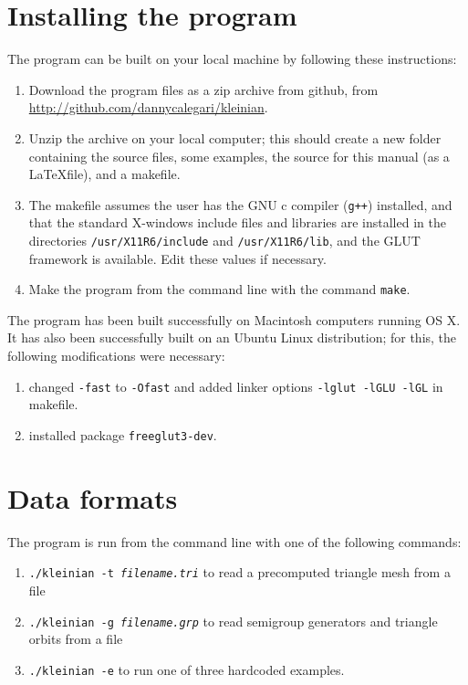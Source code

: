 \documentclass[12pt]{article}
\begin{document}
\section{Installing the program}\label{section:installation}

The program can be built on your local machine by following these instructions:

\begin{enumerate}
\item{Download the program files as a zip archive from github, from 
\url{http://github.com/dannycalegari/kleinian}.}
\item{Unzip the archive on your local computer; this should create a new folder containing
the source files, some examples, the source for this manual (as a \LaTeX file), and a
makefile.}
\item{The makefile assumes the user has the GNU c compiler ({\tt g++}) installed, and that the standard
X-windows include files and libraries are installed in the directories {\tt /usr/X11R6/include}
and {\tt /usr/X11R6/lib}, and the GLUT framework is available. 
Edit these values if necessary.}
\item{Make the program from the command line with the command {\tt make}.}
\end{enumerate}

The program has been built successfully on Macintosh computers running OS X.
It has also been successfully built on an Ubuntu Linux distribution; 
for this, the following modifications were necessary:

\begin{enumerate}
\item{changed {\tt -fast} to {\tt -Ofast} and added linker options
{\tt -lglut -lGLU -lGL} in makefile.}
\item{installed package {\tt freeglut3-dev}.}
\end{enumerate}

\section{Data formats}\label{section:data_format}

The program is run from the command line with one of the following
commands:
\begin{enumerate}
\item{{\tt ./kleinian -t {\sl filename.tri}} to read a precomputed triangle mesh from a file}
\item{{\tt ./kleinian -g {\sl filename.grp}} to read semigroup generators and triangle orbits from a file}
\item{{\tt ./kleinian -e} to run one of three hardcoded examples.}
\end{enumerate}
\end{document}
